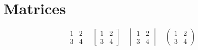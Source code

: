 \documentclass[12pt]{article}
\begin{document}
	\section{Matrices}
	\[	
		\begin{matrix}
			1 & 2 \\
			3 & 4
		\end{matrix}
		\quad
		\begin{bmatrix}
			1 & 2 \\
			3 & 4
		\end{bmatrix}
		\quad
		\begin{vmatrix}
			1 & 2 \\
			3 & 4
		\end{vmatrix}
		\quad
		\begin{pmatrix}
			1 & 2 \\
			3 & 4
		\end{pmatrix}
	\]
\end{document}
